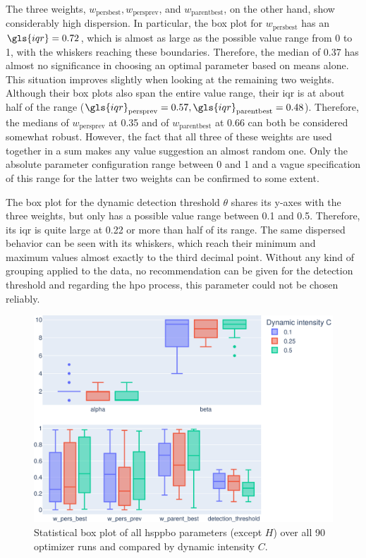 The three weights, $w_{\text{persbest}}, w_{\text{persprev}}$, and $w_{\text{parentbest}}$, on the other hand, show considerably high dispersion. In particular, the box plot for $w_{\text{persbest}}$ has an $\gls{iqr} = 0.72$, which is almost as large as the possible value range from 0 to 1, with the whiskers reaching these boundaries. Therefore, the median of 0.37 has almost no significance in choosing an optimal parameter based on means alone. This situation improves slightly when looking at the remaining two weights. Although their box plots also span the entire value range, their \gls{iqr} is at about half of the range ($\gls{iqr}_\text{persprev} = 0.57, \gls{iqr}_\text{parentbest} = 0.48$). Therefore, the medians of $w_{\text{persprev}}$ at 0.35 and of $w_{\text{parentbest}}$ at 0.66 can both be considered somewhat robust. However, the fact that all three of these weights are used together in a sum makes any value suggestion an almost random one. Only the absolute parameter configuration range between 0 and 1 and a vague specification of this range for the latter two weights can be confirmed to some extent.

The box plot for the dynamic detection threshold $\theta$ shares its y-axes with the three weights, but only has a possible value range between 0.1 and 0.5. Therefore, its \gls{iqr} is quite large at 0.22 or more than half of its range. The same dispersed behavior can be seen with its whiskers, which reach their minimum and maximum values almost exactly to the third decimal point. Without any kind of grouping applied to the data, no recommendation can be given for the detection threshold and regarding the \gls{hpo} process, this parameter could not be chosen reliably.

\begin{figure}[h]
	\centering
	\includegraphics[width=\textwidth]{results/part2/parameter_boxplot_dynamic.svg}
	\caption[Statistical box plot of \gls{hsppbo} parameters compared by dynamic intensity]{Statistical box plot of all \gls{hsppbo} parameters (except $H$) over all 90 optimizer runs and compared by dynamic intensity $C$.}
	\label{fig:parameter_boxplot_dynamic}
\end{figure}

